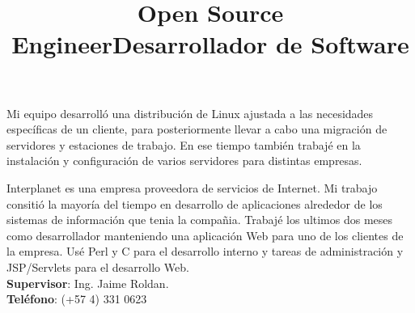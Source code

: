 \begin{resume}
\title{\textbf{Open Source Engineer}}
\begin{position}
Mi equipo desarroll\'{o} una distribuci\'{o}n de Linux ajustada a las
necesidades espec\'{i}ficas de un cliente, para posteriormente llevar
a cabo una  migraci\'{o}n de servidores y estaciones de trabajo. En ese tiempo tambi\'{e}n trabaj\'{e} en
la instalaci\'{o}n y configuraci\'{o}n de varios servidores para
distintas empresas.
\end{position}
 \newline
 \newline
 \newline
 \newline
                                   


\title{\textbf{Desarrollador de Software}}
\begin{position}
Interplanet es una empresa proveedora de servicios de Internet. Mi trabajo consiti\'{o} la mayor\'{i}a del tiempo en desarrollo de aplicaciones alrededor de los sistemas de informaci\'{o}n que tenia  la compa\~{n}ia.
Trabaj\'{e} los ultimos dos meses como desarrollador manteniendo una aplicaci\'{o}n Web para uno de los clientes de la empresa. Us\'{e} Perl y C para el desarrollo interno y tareas de administraci\'{o}n y JSP/Servlets para el desarrollo Web.\\
\textbf{Supervisor}:  Ing. Jaime Roldan.\\
\textbf{Tel\'{e}fono}:  (+57 4) 331 0623 
\end{position}




\end{resume}
